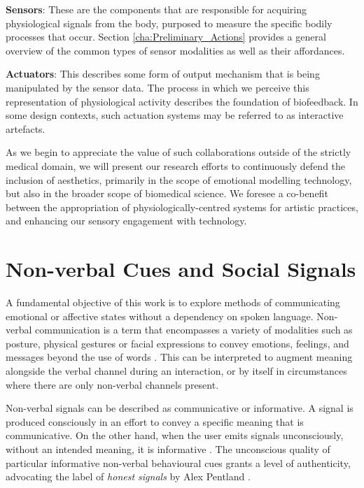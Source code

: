 \textbf{Sensors}: These are the components that are responsible for acquiring physiological signals from the body, purposed to measure the specific bodily processes that occur. Section \ref{cha:Preliminary_Actions} provides a general overview of the common types of sensor modalities as well as their affordances.

\textbf{Actuators}: This describes some form of output mechanism that is being manipulated by the sensor data. The process in which we perceive this representation of physiological activity describes the foundation of biofeedback. In some design contexts, such actuation systems may be referred to as interactive artefacts.

As we begin to appreciate the value of such collaborations outside of the strictly medical domain, we will present our research efforts to continuously defend the inclusion of aesthetics, primarily in the scope of emotional modelling technology, but also in the broader scope of biomedical science. We foresee a co-benefit between the appropriation of physiologically-centred systems for artistic practices, and enhancing our sensory engagement with technology.


\section{Non-verbal Cues and Social Signals}

A fundamental objective of this work is to explore methods of communicating emotional or affective states without a dependency on spoken language. Non-verbal communication is a term that encompasses a variety of modalities such as posture, physical gestures or facial expressions to convey emotions, feelings, and messages beyond the use of words \cite{knapp_nonverbal_2009, richmond_nonverbal_2011}. This can be interpreted to augment meaning alongside the verbal channel during an interaction, or by itself in circumstances where there are only non-verbal channels present.

Non-verbal signals can be described as communicative or informative. A signal is produced consciously in an effort to convey a specific meaning that is communicative. On the other hand, when the user emits signals unconsciously, without an intended meaning, it is informative \cite{vinciarelli_towards_2011}. The unconscious quality of particular informative non-verbal behavioural cues grants a level of authenticity, advocating the label of \textit{honest signals} by Alex Pentland \cite{pentland_honest_2010}.

